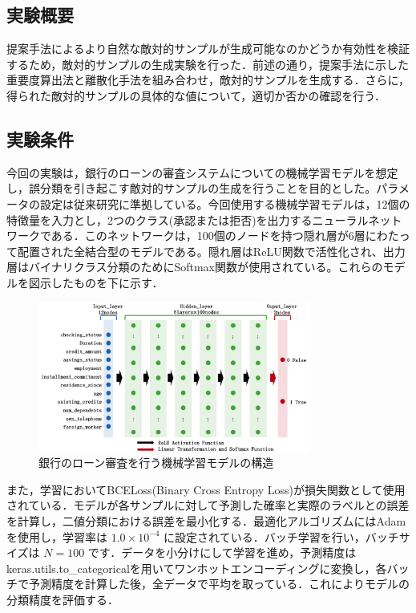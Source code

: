 \subsection{実験概要}
提案手法によるより自然な敵対的サンプルが生成可能なのかどうか有効性を検証するため，敵対的サンプルの生成実験を行った．前述の通り，提案手法に示した重要度算出法と離散化手法を組み合わせ，敵対的サンプルを生成する．さらに，得られた敵対的サンプルの具体的な値について，適切か否かの確認を行う．
\subsection{実験条件}
今回の実験は，銀行のローンの審査システムについての機械学習モデルを想定し，誤分類を引き起こす敵対的サンプルの生成を行うことを目的とした。パラメータの設定は従来研究\cite{ballet2019imperceptible}に準拠している。今回使用する機械学習モデルは，12個の特徴量を入力とし，2つのクラス(承認または拒否)を出力するニューラルネットワークである．このネットワークは，100個のノードを持つ隠れ層が6層にわたって配置された全結合型のモデルである。隠れ層はReLU関数で活性化され、出力層はバイナリクラス分類のためにSoftmax関数が使用されている。これらのモデルを図示したものを下に示す．

\begin{figure}[H]
    \centering
    \includegraphics[width=0.8\textwidth]{images/審査モデル.png}
    \caption{銀行のローン審査を行う機械学習モデルの構造}
    \label{fig:adversarial_example}
\end{figure}

また，学習においてBCELoss(Binary Cross Entropy Loss)が損失関数として使用されている．モデルが各サンプルに対して予測した確率と実際のラベルとの誤差を計算し，二値分類における誤差を最小化する．最適化アルゴリズムにはAdamを使用し，学習率は $1.0 \times 10^{-4}$ に設定されている．バッチ学習を行い，バッチサイズは $N=100$ です．データを小分けにして学習を進め，予測精度はkeras.utils.to\_categoricalを用いてワンホットエンコーディングに変換し，各バッチで予測精度を計算した後，全データで平均を取っている．これによりモデルの分類精度を評価する．

